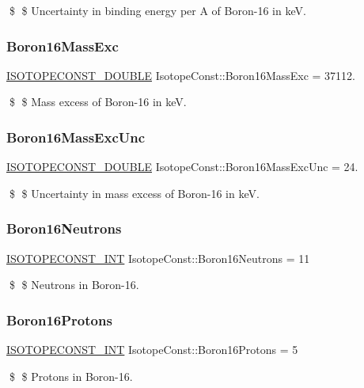 \$ \$ Uncertainty in binding energy per A of Boron-\/16 in keV. \mbox{\label{group___isotope_const-_boron-_b16_ga3ca7cb67a96b4053f72eb64cf04ef277}} 
\subsubsection{\texorpdfstring{Boron16\+Mass\+Exc}{Boron16MassExc}}
{\footnotesize\ttfamily \mbox{\hyperlink{group___isotope_const-_macros_ga8f45a7272ce02c0b4c65c44636ed719a}{I\+S\+O\+T\+O\+P\+E\+C\+O\+N\+S\+T\+\_\+\+D\+O\+U\+B\+LE}} Isotope\+Const\+::\+Boron16\+Mass\+Exc = 37112.}

\$ \$ Mass excess of Boron-\/16 in keV. \mbox{\label{group___isotope_const-_boron-_b16_ga5f0e1f182d3d4f0c0a89ac97b84f3a2c}} 
\subsubsection{\texorpdfstring{Boron16\+Mass\+Exc\+Unc}{Boron16MassExcUnc}}
{\footnotesize\ttfamily \mbox{\hyperlink{group___isotope_const-_macros_ga8f45a7272ce02c0b4c65c44636ed719a}{I\+S\+O\+T\+O\+P\+E\+C\+O\+N\+S\+T\+\_\+\+D\+O\+U\+B\+LE}} Isotope\+Const\+::\+Boron16\+Mass\+Exc\+Unc = 24.}

\$ \$ Uncertainty in mass excess of Boron-\/16 in keV. \mbox{\label{group___isotope_const-_boron-_b16_gaf5804672274b093ebe307a1d74aa40c4}} 
\subsubsection{\texorpdfstring{Boron16\+Neutrons}{Boron16Neutrons}}
{\footnotesize\ttfamily \mbox{\hyperlink{group___isotope_const-_macros_ga5f18360b3e99483a35c32d789e62621c}{I\+S\+O\+T\+O\+P\+E\+C\+O\+N\+S\+T\+\_\+\+I\+NT}} Isotope\+Const\+::\+Boron16\+Neutrons = 11}

\$ \$ Neutrons in Boron-\/16. \mbox{\label{group___isotope_const-_boron-_b16_ga0834bda630660424a9d14b2c5cbcfcca}} 
\subsubsection{\texorpdfstring{Boron16\+Protons}{Boron16Protons}}
{\footnotesize\ttfamily \mbox{\hyperlink{group___isotope_const-_macros_ga5f18360b3e99483a35c32d789e62621c}{I\+S\+O\+T\+O\+P\+E\+C\+O\+N\+S\+T\+\_\+\+I\+NT}} Isotope\+Const\+::\+Boron16\+Protons = 5}

\$ \$ Protons in Boron-\/16. 
